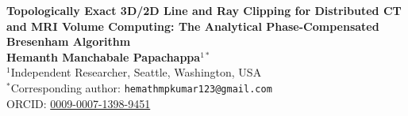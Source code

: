 \documentclass[11pt]{article}
\begin{document}
\begin{center}
    {\LARGE \textbf{Topologically Exact 3D/2D Line and Ray Clipping for Distributed CT and MRI Volume Computing: The Analytical Phase-Compensated Bresenham Algorithm}}\\[14pt]
    
    \textbf{Hemanth Manchabale Papachappa}$^{1*}$\\[6pt]
    $^{1}$Independent Researcher, Seattle, Washington, USA\\[4pt]
    $^*$Corresponding author: \texttt{hemathmpkumar123@gmail.com}\\
    ORCID: \href{https://orcid.org/0009-0007-1398-9451}{0009-0007-1398-9451}
\end{center}

\vspace{0.4cm}
\end{document}
